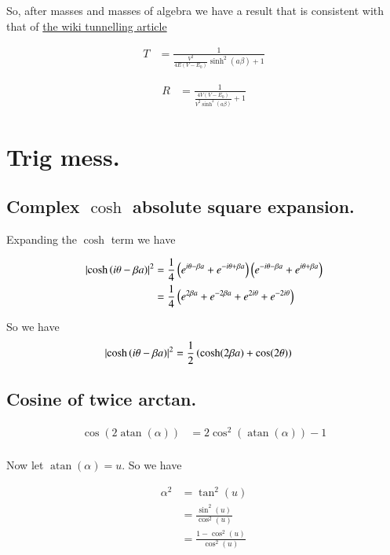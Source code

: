 \documentclass{article}
\DeclareMathOperator{\atan}{atan}
\begin{document}
So, after masses and masses of algebra we have a result that is consistent with that of
\href{http://en.wikipedia.org/wiki/Potential_barrier}{the wiki tunnelling article}

\begin{align}
T 
&= \frac{1} { \frac{V^2}{4E(V-E_0)} \sinh^2(a \beta) + 1 }
\end{align}

\begin{align}
R 
&= \frac{1} { \frac{4V(V-E_0)}{V^2 \sinh^2(a \beta)} + 1 }
\end{align}

\section{ Trig mess. }

\subsection{ Complex $\cosh$ absolute square expansion. }

Expanding the $\cosh$ term we have

\begin{align*}
\left\lvert{\cosh\left( i\theta -\beta a \right)}\right\rvert^2
&=
\frac{1}{4}
\left(
e^{i\theta - \beta a}
+ e^{-i\theta + \beta a}
\right)
\left(
e^{-i\theta - \beta a}
+ e^{i\theta + \beta a}
\right) \\
&=
\frac{1}{4}\left(
e^{2\beta a}
+ e^{-2\beta a}
+e^{2i\theta }
+e^{-2i\theta }
\right) \\
\end{align*}

So we have
\begin{align}\label{eqn:coshSquared}
\left\lvert{\cosh\left( i\theta -\beta a \right)}\right\rvert^2
&=\frac{1}{2}
\left( \cosh(2\beta a) + \cos(2\theta) \right)
\end{align}

\subsection{ Cosine of twice arctan. }

\begin{align*}
\cos(2\atan(\alpha)) 
&= 
2 \cos^2\left( \atan(\alpha) \right) -1 \\
\end{align*}

Now let $\atan(\alpha) = u$.  So we have

\begin{align*}
\alpha^2 
&=
\tan^2(u)  \\
&=
\frac{\sin^2(u)}{\cos^2(u)} \\
&=
\frac{1 -\cos^2(u)}{\cos^2(u)} \\
\end{align*}
\end{document}
